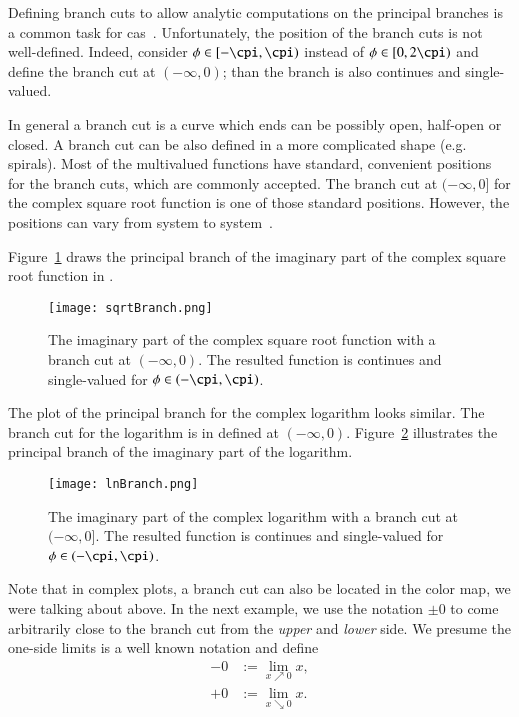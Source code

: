 Defining branch cuts to allow analytic computations on the principal branches is a common task for \gls{cas}~\cite{Maple:Cuts}. Unfortunately, the position of the branch cuts is not well-defined. Indeed, consider $\phi \in [-\cpi,\cpi)$ instead of $\phi \in [0,2\cpi)$ and define the branch cut at $(-\infty, 0)$; than the branch is also continues and single-valued. 

In general a branch cut is a curve which ends can be possibly open, half-open or closed. A branch cut can be also defined in a more complicated shape (e.g. spirals). Most of the multivalued functions have standard, convenient positions for the branch cuts, which are commonly accepted. The branch cut at $(-\infty, 0]$ for the complex square root function is one of those standard positions. However, the positions can vary from system to system~\cite{Branches:acot}.

Figure~\ref{fig:sqrtBranch} draws the principal branch of the imaginary part of the complex square root function in \Maple.
 
\begin{figure}[ht]
	\centering
	\texttt{[image: sqrtBranch.png]}
	\caption{The imaginary part of the complex square root function with a branch cut at $(-\infty, 0)$. The resulted function is continues and single-valued for $\phi \in (-\cpi, \cpi)$.}
	\label{fig:sqrtBranch}
\end{figure}

The plot of the principal branch for the complex logarithm looks similar. The branch cut for the logarithm is in \Maple{} defined at $(-\infty,0)$. Figure~\ref{fig:lnBranch} illustrates the principal branch of the imaginary part of the logarithm.

\begin{figure}[H]
	\centering
	\texttt{[image: lnBranch.png]}
	\caption{The imaginary part of the complex logarithm with a branch cut at $(-\infty, 0]$. The resulted function is continues and single-valued for $\phi \in (-\cpi, \cpi)$.}
	\label{fig:lnBranch}
\end{figure}

Note that in complex plots, a branch cut can also be located in the color map, we were talking about above. In the next example, we use the notation $\pm 0$ to come arbitrarily close to the branch cut from the \textit{upper} and \textit{lower} side. We presume the one-side limits is a well known notation and define
\begin{align}
-0 &:= \underset{x\nearrow 0}{\lim}x,\\
+0 &:= \underset{x\searrow 0}{\lim}x.
\end{align}


